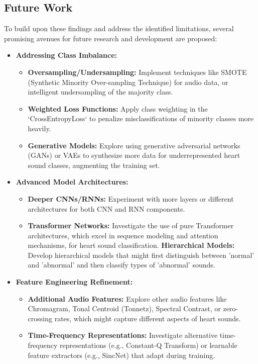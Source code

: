 \documentclass[a4paper]{article}
\begin{document}
\begin{multicols}{2}
\subsection{Future Work}
To build upon these findings and address the identified limitations, several promising avenues for future research and development are proposed:
\begin{itemize}
    \item \textbf{Addressing Class Imbalance:}
        \begin{itemize}
            \item \textbf{Oversampling/Undersampling:} Implement techniques like SMOTE (Synthetic Minority Over-sampling Technique) for audio data, or intelligent undersampling of the majority class.
            \item \textbf{Weighted Loss Functions:} Apply class weighting in the `CrossEntropyLoss` to penalize misclassifications of minority classes more heavily.
            \item \textbf{Generative Models:} Explore using generative adversarial networks (GANs) or VAEs to synthesize more data for underrepresented heart sound classes, augmenting the training set.
        \end{itemize}
    \item \textbf{Advanced Model Architectures:}
        \begin{itemize}
            \item \textbf{Deeper CNNs/RNNs:} Experiment with more layers or different architectures for both CNN and RNN components.
            \item \textbf{Transformer Networks:} Investigate the use of pure Transformer architectures, which excel in sequence modeling and attention mechanisms, for heart sound classification.
            \textbf{Hierarchical Models:} Develop hierarchical models that might first distinguish between 'normal' and 'abnormal' and then classify types of 'abnormal' sounds.
        \end{itemize}
    \item \textbf{Feature Engineering Refinement:}
        \begin{itemize}
            \item \textbf{Additional Audio Features:} Explore other audio features like Chromagram, Tonal Centroid (Tonnetz), Spectral Contrast, or zero-crossing rates, which might capture different aspects of heart sounds.
            \item \textbf{Time-Frequency Representations:} Investigate alternative time-frequency representations (e.g., Constant-Q Transform) or learnable feature extractors (e.g., SincNet) that adapt during training.

\end{itemize}
\end{itemize}
\end{multicols}
\end{document}
